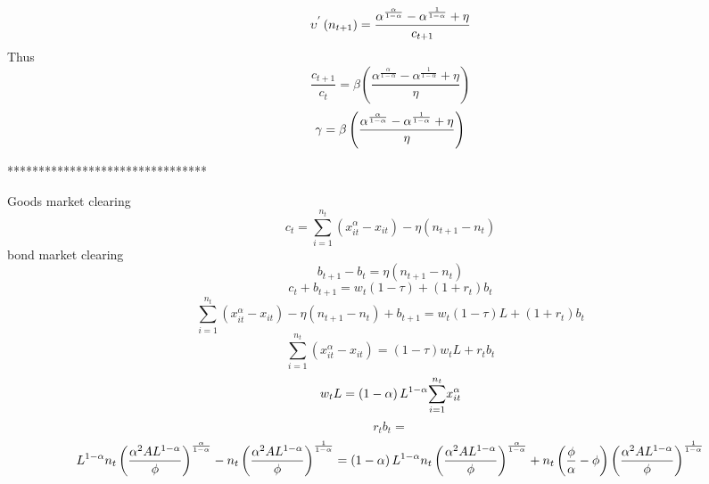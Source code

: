\documentclass[11pt]{article}
\begin{document}
\begin{enumerate}
\begin{equation*}
\upsilon ^{^{\prime }}\left( n_{t+1}\right) =\frac{\alpha ^{\frac{\alpha }{%
1-\alpha }}-\alpha ^{\frac{1}{1-\alpha }}+\eta }{c_{t+1}}
\end{equation*}%
Thus 
\begin{equation*}
\frac{c_{t+1}}{c_{t}}=\beta \left( \frac{\alpha ^{\frac{\alpha }{1-\alpha }%
}-\alpha ^{\frac{1}{1-\alpha }}+\eta }{\eta }\right) 
\end{equation*}%
\begin{equation*}
\gamma =\beta \left( \frac{\alpha ^{\frac{\alpha }{1-\alpha }}-\alpha ^{%
\frac{1}{1-\alpha }}+\eta }{\eta }\right) 
\end{equation*}
\end{enumerate}

********************************

Goods market clearing%
\begin{equation*}
c_{t}=\overset{n_{t}}{\underset{i=1}{\sum }}\left( x_{it}^{\alpha
}-x_{it}\right) -\eta \left( n_{t+1}-n_{t}\right) 
\end{equation*}%
bond market clearing 
\begin{equation*}
b_{t+1}-b_{t}=\eta \left( n_{t+1}-n_{t}\right) 
\end{equation*}%
\begin{equation*}
c_{t}+b_{t+1}=w_{t}\left( 1-\tau \right) +\left( 1+r_{t}\right) b_{t}
\end{equation*}%
\begin{equation*}
\overset{n_{t}}{\underset{i=1}{\sum }}\left( x_{it}^{\alpha }-x_{it}\right)
-\eta \left( n_{t+1}-n_{t}\right) +b_{t+1}=w_{t}\left( 1-\tau \right)
L+\left( 1+r_{t}\right) b_{t}
\end{equation*}%
\begin{equation*}
\overset{n_{t}}{\underset{i=1}{\sum }}\left( x_{it}^{\alpha }-x_{it}\right)
=\left( 1-\tau \right) w_{t}L+r_{t}b_{t}
\end{equation*}%
\begin{equation*}
w_{t}L=\left( 1-\alpha \right) L^{1-\alpha }\overset{n_{t}}{\underset{i=1}{%
\sum }}x_{it}^{\alpha }
\end{equation*}%
\begin{equation*}
r_{t}b_{t}=
\end{equation*}%
\begin{equation*}
L^{1-\alpha }n_{t}\left( \frac{\alpha ^{2}AL^{1-\alpha }}{\phi }\right) ^{%
\frac{\alpha }{1-\alpha }}-n_{t}\left( \frac{\alpha ^{2}AL^{1-\alpha }}{\phi 
}\right) ^{\frac{1}{1-\alpha }}=\left( 1-\alpha \right) L^{1-\alpha
}n_{t}\left( \frac{\alpha ^{2}AL^{1-\alpha }}{\phi }\right) ^{\frac{\alpha }{%
1-\alpha }}+n_{t}\left( \frac{\phi }{\alpha }-\phi \right) \left( \frac{%
\alpha ^{2}AL^{1-\alpha }}{\phi }\right) ^{\frac{1}{1-\alpha }}
\end{equation*}%
\end{document}
